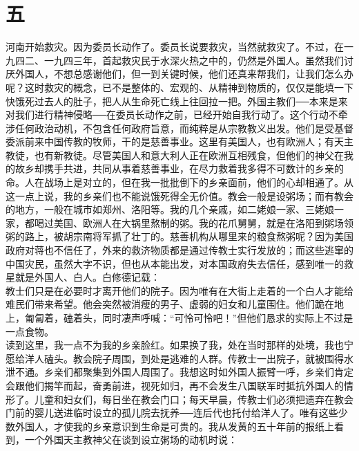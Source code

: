 \fancyhead[RO]{\thepage} %
\fancyhead[LE]{\thepage} %
\fancyfoot[LE,RO]{}
\fancyfoot[LO,CE]{}
\fancyfoot[CO,RE]{}
\chapter*{五}
河南开始救灾。因为委员长动作了。委员长说要救灾，当然就救灾了。不过，在一九四二、一九四三年，首起救灾民于水深火热之中的，仍然是外国人。虽然我们讨厌外国人，不想总感谢他们，但一到关键时候，他们还真来帮我们，让我们怎么办呢？这时救灾的概念，已不是整体的、宏观的、从精神到物质的，仅仅是能填一下快饿死过去人的肚子，把人从生命死亡线上往回拉一把。外国主教们{\Add ──}本来是来对我们进行精神侵略{\Add ──}在委员长动作之前，已经开始自我行动了。这个行动不牵涉任何政治动机，不包含任何政府旨意，而纯粹是从宗教教义出发。他们是受基督委派前来中国传教的牧师，干的是慈善事业。这里有美国人，也有欧洲人；有天主教徒，也有新教徒。尽管美国人和意大利人正在欧洲互相残食，但他们的神父在我的故乡却携手共进，共同从事着慈善事业，在尽力救着我多得不可数计的乡亲的命。人在战场上是对立的，但在我一批批倒下的乡亲面前，他们的心却相通了。从这一点上说，我的乡亲们也不能说饿死得全无价值。教会一般是设粥场；而有教会的地方，一般在城市如郑州、洛阳等。我的几个亲戚，如二姥娘一家、三姥娘一家，都喝过美国、欧洲人在大锅里熬制的粥。我的花爪舅舅，就是在洛阳到粥场领粥的路上，被胡宗南将军抓了壮丁的。慈善机构从哪里来的粮食熬粥呢？因为美国政府对蒋也不信任了，外来的救济物质都是通过传教士实行发放的；而这些逃窜的中国灾民，虽然大字不识，但也从本能出发，对本国政府失去信任，感到唯一的救星就是外国人、白人。白修德记载：\\

教士们只是在必要时才离开他们的院子。因为唯有在大街上走着的一个白人才能给难民们带来希望。他会突然被消瘦的男子、虚弱的妇女和儿童围住。他们跪在地上，匍匐着，磕着头，同时凄声呼喊：“可怜可怜吧！”但他们恳求的实际上不过是一点食物。\\

读到这里，我一点不为我的乡亲脸红。如果换了我，处在当时那样的处境，我也宁愿给洋人磕头。教会院子周围，到处是逃难的人群。传教士一出院子，就被围得水泄不通。乡亲们都聚集到外国人周围了。我想这时如外国人振臂一呼，乡亲们肯定会跟他们揭竿而起，奋勇前进，视死如归，再不会发生八国联军时抵抗外国人的情形了。儿童和妇女们，每日坐在教会门口；每天早晨，传教士们必须把遗弃在教会门前的婴儿送进临时设立的孤儿院去抚养{\Add ──}连后代也托付给洋人了。唯有这些少数外国人，才使我的乡亲意识到生命是可贵的。我从发黄的五十年前的报纸上看到，一个外国天主教神父在谈到设立粥场的动机时说：\\

